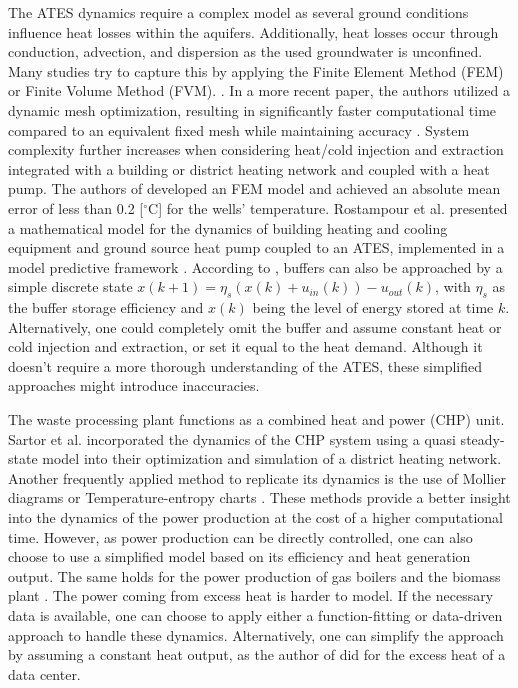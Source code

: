 The ATES dynamics require a complex model as several ground conditions influence heat losses within the aquifers. Additionally, heat losses occur through conduction, advection, and dispersion as the used groundwater is unconfined. Many studies try to capture this by applying the Finite Element Method (FEM) or Finite Volume Method (FVM). \cite{ZHOU2013240,GALGARO2013107,YAPPAROVA20141011}. In a more recent paper, the authors utilized a dynamic mesh optimization, resulting in significantly faster computational time compared to an equivalent fixed mesh while maintaining accuracy \cite{Salinas2022}. System complexity further increases when considering heat/cold injection and extraction integrated with a building or district heating network and coupled with a heat pump. The authors of \cite{BOZKAYA2017620} developed an FEM model and achieved an absolute mean error of less than 0.2 [$^{\circ}\text{C}$] for the wells' temperature. Rostampour et al. presented a mathematical model for the dynamics of building heating and cooling equipment and ground source heat pump coupled to an ATES, implemented in a model predictive framework \cite{TAMASRostampour}. According to \cite{YvoPutter}, buffers can also be approached by a simple discrete state $x(k+1) = \eta_s(x(k) + u_{in}(k)) - u_{out}(k)$, with $\eta_{s}$ as the buffer storage efficiency and $x(k)$ being the level of energy stored at time $k$.  Alternatively, one could completely omit the buffer and assume constant heat or cold injection and extraction, or set it equal to the heat demand. Although it doesn't require a more thorough understanding of the ATES, these simplified approaches might introduce inaccuracies. 

The waste processing plant functions as a combined heat and power (CHP) unit. Sartor et al. \cite{SARTOR2014474} incorporated the dynamics of the CHP system using a quasi steady-state model into their optimization and simulation of a district heating network. Another frequently applied method to replicate its dynamics is the use of Mollier diagrams or Temperature-entropy charts \cite{Laakkonen2017}. These methods provide a better insight into the dynamics of the power production at the cost of a higher computational time. However, as power production can be directly controlled, one can also choose to use a simplified model based on its efficiency and heat generation output. The same holds for the power production of gas boilers and the biomass plant \cite{Talebi,Tamasboilers}. The power coming from excess heat is harder to model. If the necessary data is available, one can choose to apply either a function-fitting or data-driven approach to handle these dynamics. Alternatively, one can simplify the approach by assuming a constant heat output, as the author of \cite{Spruit2020} did for the excess heat of a data center.

